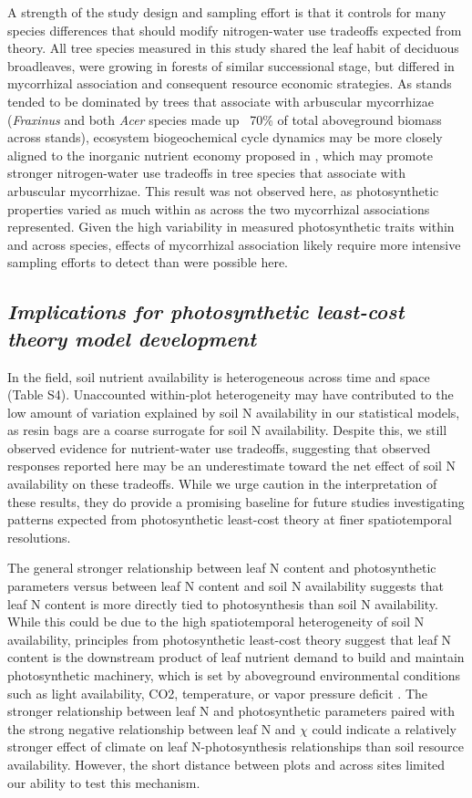     A strength of the study design and sampling effort is that it controls for many species differences that should modify nitrogen-water use tradeoffs expected from theory. All tree species measured in this study shared the leaf habit of deciduous broadleaves, were growing in forests of similar successional stage, but differed in mycorrhizal association and consequent resource economic strategies. As stands tended to be dominated by trees that associate with arbuscular mycorrhizae (\textit{Fraxinus} and both \textit{Acer} species made up ~70\% of total aboveground biomass across stands), ecosystem biogeochemical cycle dynamics may be more closely aligned to the inorganic nutrient economy proposed in , which may promote stronger nitrogen-water use tradeoffs in tree species that associate with arbuscular mycorrhizae. This result was not observed here, as photosynthetic properties varied as much within as across the two mycorrhizal associations represented. Given the high variability in measured photosynthetic traits within and across species, effects of mycorrhizal association likely require more intensive sampling efforts to detect than were possible here.
    \subsection{\textit{Implications for photosynthetic least-cost theory model development}}

    In the field, soil nutrient availability is heterogeneous across time and space (Table S4). Unaccounted within-plot heterogeneity may have contributed to the low amount of variation explained by soil N availability in our statistical models, as resin bags are a coarse surrogate for soil N availability. Despite this, we still observed evidence for nutrient-water use tradeoffs, suggesting that observed responses reported here may be an underestimate toward the net effect of soil N availability on these tradeoffs. While we urge caution in the interpretation of these results, they do provide a promising baseline for future studies investigating patterns expected from photosynthetic least-cost theory at finer spatiotemporal resolutions.
    
    The general stronger relationship between leaf N content and photosynthetic parameters versus between leaf N content and soil N availability suggests that leaf N content is more directly tied to photosynthesis than soil N availability. While this could be due to the high spatiotemporal heterogeneity of soil N availability, principles from photosynthetic least-cost theory suggest that leaf N content is the downstream product of leaf nutrient demand to build and maintain photosynthetic machinery, which is set by aboveground environmental conditions such as light availability, CO2, temperature, or vapor pressure deficit . The stronger relationship between leaf N and photosynthetic parameters paired with the strong negative relationship between leaf N and $\chi$ could indicate a relatively stronger effect of climate on leaf N-photosynthesis relationships than soil resource availability. However, the short distance between plots and across sites limited our ability to test this mechanism.
    
